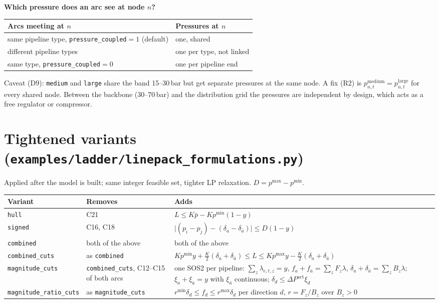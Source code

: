 \documentclass[11pt,a4paper]{article}
\newcommand{\code}[1]{\texttt{#1}}
\newcommand{\pmin}{p^{\min}}
\newcommand{\pmax}{p^{\max}}
\newcommand{\dPa}{\Delta P^{\mathrm{act}}}
\newcommand{\abar}{\bar a}
\begin{document}
\textbf{Which pressure does an arc see at node $n$?}

\begin{tabularx}{\linewidth}{@{}X l@{}}
\toprule
Arcs meeting at $n$ & Pressures at $n$ \\
\midrule
same pipeline type, \code{pressure\_coupled}$=1$ (default) & one, shared \\
different pipeline types & one per type, not linked \\
same type, \code{pressure\_coupled}$=0$ & one per pipeline end \\
\bottomrule
\end{tabularx}

\smallskip
{\color{warn}Caveat (D9):} \code{medium} and \code{large} share the band
15--30\,bar but get separate pressures at the same node. A fix (R2) is
$p^{\mathrm{medium}}_{n,t}=p^{\mathrm{large}}_{n,t}$ for every shared node.
Between the backbone (30--70\,bar) and the distribution grid the pressures are
independent by design, which acts as a free regulator or compressor.

\section{Tightened variants (\code{examples/ladder/linepack\_formulations.py})}

Applied after the model is built; same integer feasible set, tighter LP
relaxation. $D=\pmax-\pmin$.

\begin{tabularx}{\linewidth}{@{}l l X@{}}
\toprule
Variant & Removes & Adds \\
\midrule
\code{hull} & C21 & $L\le K\bar p - K\pmin(1-y)$ \\
\code{signed} & C16, C18 & $\bigl\lvert(p_i-p_j)-(\delta_a-\delta_{\abar})\bigr\rvert\le D(1-y)$ \\
\code{combined} & both of the above & both of the above \\
\code{combined\_cuts} & as \code{combined} &
  $K\pmin y+\tfrac K2(\delta_a+\delta_{\abar})\le L\le K\pmax y-\tfrac K2(\delta_a+\delta_{\abar})$ \\
\code{magnitude\_cuts} & \code{combined\_cuts}, C12--C15 of both arcs &
  one SOS2 per pipeline: $\sum_z\lambda_{e,t,z}=y$,
  $f_a+f_{\abar}=\sum_z F_z\lambda$, $\delta_a+\delta_{\abar}=\sum_z B_z\lambda$;
  $\xi_a+\xi_{\abar}=y$ with $\xi_{\abar}$ continuous; $\delta_d\le\dPa\xi_d$ \\
\code{magnitude\_ratio\_cuts} & as \code{magnitude\_cuts} &
  $r^{\min}\delta_d\le f_d\le r^{\max}\delta_d$ per direction $d$,
  $r=F_z/B_z$ over $B_z>0$ \\
\bottomrule
\end{tabularx}
\end{document}

